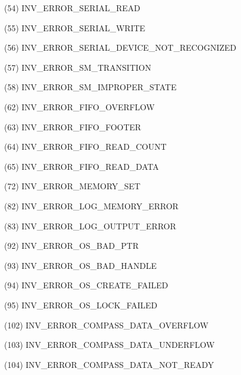 \begin{DoxyItemize}
\item (54) I\+N\+V\+\_\+\+E\+R\+R\+O\+R\+\_\+\+S\+E\+R\+I\+A\+L\+\_\+\+R\+E\+A\+D
\item (55) I\+N\+V\+\_\+\+E\+R\+R\+O\+R\+\_\+\+S\+E\+R\+I\+A\+L\+\_\+\+W\+R\+I\+T\+E
\item (56) I\+N\+V\+\_\+\+E\+R\+R\+O\+R\+\_\+\+S\+E\+R\+I\+A\+L\+\_\+\+D\+E\+V\+I\+C\+E\+\_\+\+N\+O\+T\+\_\+\+R\+E\+C\+O\+G\+N\+I\+Z\+E\+D
\item (57) I\+N\+V\+\_\+\+E\+R\+R\+O\+R\+\_\+\+S\+M\+\_\+\+T\+R\+A\+N\+S\+I\+T\+I\+O\+N
\item (58) I\+N\+V\+\_\+\+E\+R\+R\+O\+R\+\_\+\+S\+M\+\_\+\+I\+M\+P\+R\+O\+P\+E\+R\+\_\+\+S\+T\+A\+T\+E
\item (62) I\+N\+V\+\_\+\+E\+R\+R\+O\+R\+\_\+\+F\+I\+F\+O\+\_\+\+O\+V\+E\+R\+F\+L\+O\+W
\item (63) I\+N\+V\+\_\+\+E\+R\+R\+O\+R\+\_\+\+F\+I\+F\+O\+\_\+\+F\+O\+O\+T\+E\+R
\item (64) I\+N\+V\+\_\+\+E\+R\+R\+O\+R\+\_\+\+F\+I\+F\+O\+\_\+\+R\+E\+A\+D\+\_\+\+C\+O\+U\+N\+T
\item (65) I\+N\+V\+\_\+\+E\+R\+R\+O\+R\+\_\+\+F\+I\+F\+O\+\_\+\+R\+E\+A\+D\+\_\+\+D\+A\+T\+A
\item (72) I\+N\+V\+\_\+\+E\+R\+R\+O\+R\+\_\+\+M\+E\+M\+O\+R\+Y\+\_\+\+S\+E\+T
\item (82) I\+N\+V\+\_\+\+E\+R\+R\+O\+R\+\_\+\+L\+O\+G\+\_\+\+M\+E\+M\+O\+R\+Y\+\_\+\+E\+R\+R\+O\+R
\item (83) I\+N\+V\+\_\+\+E\+R\+R\+O\+R\+\_\+\+L\+O\+G\+\_\+\+O\+U\+T\+P\+U\+T\+\_\+\+E\+R\+R\+O\+R
\item (92) I\+N\+V\+\_\+\+E\+R\+R\+O\+R\+\_\+\+O\+S\+\_\+\+B\+A\+D\+\_\+\+P\+T\+R
\item (93) I\+N\+V\+\_\+\+E\+R\+R\+O\+R\+\_\+\+O\+S\+\_\+\+B\+A\+D\+\_\+\+H\+A\+N\+D\+L\+E
\item (94) I\+N\+V\+\_\+\+E\+R\+R\+O\+R\+\_\+\+O\+S\+\_\+\+C\+R\+E\+A\+T\+E\+\_\+\+F\+A\+I\+L\+E\+D
\item (95) I\+N\+V\+\_\+\+E\+R\+R\+O\+R\+\_\+\+O\+S\+\_\+\+L\+O\+C\+K\+\_\+\+F\+A\+I\+L\+E\+D
\item (102) I\+N\+V\+\_\+\+E\+R\+R\+O\+R\+\_\+\+C\+O\+M\+P\+A\+S\+S\+\_\+\+D\+A\+T\+A\+\_\+\+O\+V\+E\+R\+F\+L\+O\+W
\item (103) I\+N\+V\+\_\+\+E\+R\+R\+O\+R\+\_\+\+C\+O\+M\+P\+A\+S\+S\+\_\+\+D\+A\+T\+A\+\_\+\+U\+N\+D\+E\+R\+F\+L\+O\+W
\item (104) I\+N\+V\+\_\+\+E\+R\+R\+O\+R\+\_\+\+C\+O\+M\+P\+A\+S\+S\+\_\+\+D\+A\+T\+A\+\_\+\+N\+O\+T\+\_\+\+R\+E\+A\+D\+Y

\end{DoxyItemize}
